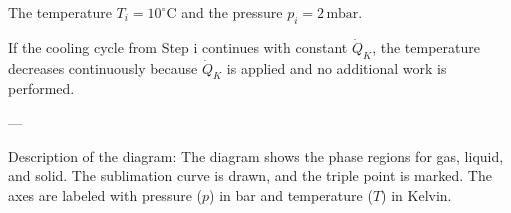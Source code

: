The temperature \( T_i = 10^\circ\text{C} \) and the pressure \( p_i = 2 \, \text{mbar} \).  

If the cooling cycle from Step i continues with constant \( \dot{Q}_K \), the temperature decreases continuously because \( \dot{Q}_K \) is applied and no additional work is performed.  

---

Description of the diagram:  
The diagram shows the phase regions for gas, liquid, and solid. The sublimation curve is drawn, and the triple point is marked. The axes are labeled with pressure (\( p \)) in bar and temperature (\( T \)) in Kelvin.